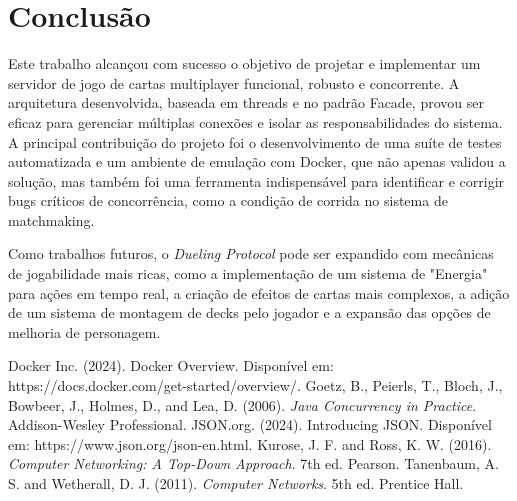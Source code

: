 \documentclass[12pt,a4paper]{article}
\begin{document}
\section{Conclusão}

Este trabalho alcançou com sucesso o objetivo de projetar e implementar um servidor de jogo de cartas multiplayer funcional, robusto e concorrente. A arquitetura desenvolvida, baseada em threads e no padrão Facade, provou ser eficaz para gerenciar múltiplas conexões e isolar as responsabilidades do sistema. A principal contribuição do projeto foi o desenvolvimento de uma suíte de testes automatizada e um ambiente de emulação com Docker, que não apenas validou a solução, mas também foi uma ferramenta indispensável para identificar e corrigir bugs críticos de concorrência, como a condição de corrida no sistema de matchmaking.

Como trabalhos futuros, o \textit{Dueling Protocol} pode ser expandido com mecânicas de jogabilidade mais ricas, como a implementação de um sistema de "Energia" para ações em tempo real, a criação de efeitos de cartas mais complexos, a adição de um sistema de montagem de decks pelo jogador e a expansão das opções de melhoria de personagem.

\begin{thebibliography}{9}
 Docker Inc. (2024). Docker Overview. Disponível em: https://docs.docker.com/get-started/overview/.
 Goetz, B., Peierls, T., Bloch, J., Bowbeer, J., Holmes, D., and Lea, D. (2006). \textit{Java Concurrency in Practice}. Addison-Wesley Professional.
 JSON.org. (2024). Introducing JSON. Disponível em: https://www.json.org/json-en.html.
 Kurose, J. F. and Ross, K. W. (2016). \textit{Computer Networking: A Top-Down Approach}. 7th ed. Pearson.
 Tanenbaum, A. S. and Wetherall, D. J. (2011). \textit{Computer Networks}. 5th ed. Prentice Hall.
\end{thebibliography}
\end{document}
